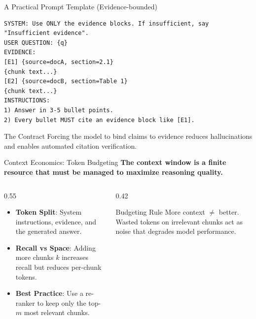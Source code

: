 \documentclass[aspectratio=169, xcolor=table]{beamer}
\newif\ifanimated
\newcommand{\cpause}{\ifanimated\pause\fi}
\begin{document}
\begin{frame}[fragile]{A Practical Prompt Template (Evidence-bounded)}
\begin{tcolorbox}[colback=gray!8,colframe=gray!40,title=Template, fontupper=\footnotesize]
\begin{lstlisting}[basicstyle=\ttfamily\tiny]
SYSTEM: Use ONLY the evidence blocks. If insufficient, say "Insufficient evidence".
USER QUESTION: {q}
EVIDENCE:
[E1] {source=docA, section=2.1}
{chunk text...}
[E2] {source=docB, section=Table 1}
{chunk text...}
INSTRUCTIONS:
1) Answer in 3-5 bullet points.
2) Every bullet MUST cite an evidence block like [E1].
\end{lstlisting}
\end{tcolorbox}

\cpause
\vspace{-0.5em}
\begin{alertblock}{The Contract}
\footnotesize
Forcing the model to bind claims to evidence reduces hallucinations and enables automated citation verification.
\end{alertblock}
\end{frame}

\begin{frame}{Context Economics: Token Budgeting}
\textbf{The context window is a finite resource that must be managed to maximize reasoning quality.}

\vspace{0.8em}
\begin{columns}
\begin{column}{0.55\textwidth}
\begin{itemize}
    \item \textbf{Token Split}: System instructions, evidence, and the generated answer.
    \item \textbf{Recall vs Space}: Adding more chunks $k$ increases recall but reduces per-chunk tokens.
    \item \textbf{Best Practice}: Use a re-ranker to keep only the top-$m$ most relevant chunks.
\end{itemize}
\end{column}
\begin{column}{0.42\textwidth}
\begin{alertblock}{Budgeting Rule}
More context $\neq$ better. Wasted tokens on irrelevant chunks act as noise that degrades model performance.
\end{alertblock}
\end{column}
\end{columns}
\end{frame}
\end{document}
